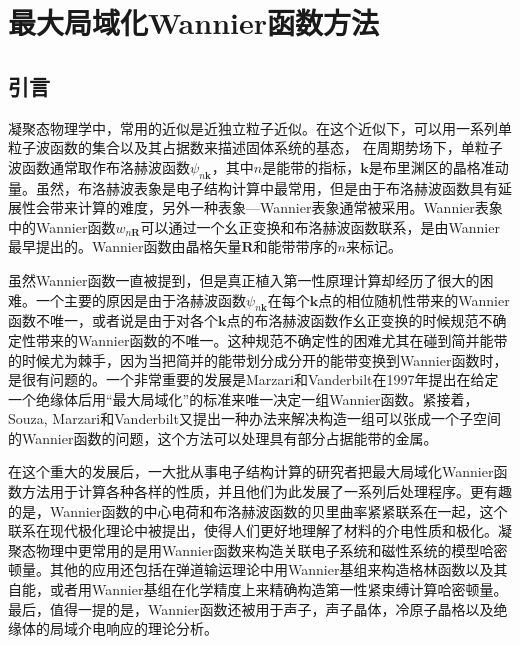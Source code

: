 \section{最大局域化Wannier函数方法}
\subsection{引言}
凝聚态物理学中，常用的近似是近独立粒子近似。在这个近似下，可以用一系列单粒子波函数的集合以及其占据数来描述固体系统的基态，
在周期势场下，单粒子波函数通常取作布洛赫波函数$\psi_{n\bm{k}}$，其中$n$是能带的指标，$\bm{k}$是布里渊区的晶格准动量。虽然，布洛赫波表象是电子结构计算中最常用，但是由于布洛赫波函数具有延展性会带来计算的难度，另外一种表象—Wannier表象通常被采用。Wannier表象中的Wannier函数$w_{n\bm{R}}$可以通过一个幺正变换和布洛赫波函数联系，是由Wannier最早提出的。Wannier函数由晶格矢量$\bm{R}$和能带带序的$n$来标记。

虽然Wannier函数一直被提到，但是真正植入第一性原理计算却经历了很大的困难。一个主要的原因是由于洛赫波函数$\psi_{n\bm{k}}$在每个$\bm{k}$点的相位随机性带来的Wannier函数不唯一，或者说是由于对各个$\bm{k}$点的布洛赫波函数作幺正变换的时候规范不确定性带来的Wannier函数的不唯一。这种规范不确定性的困难尤其在碰到简并能带的时候尤为棘手，因为当把简并的能带划分成分开的能带变换到Wannier函数时，是很有问题的。一个非常重要的发展是Marzari和Vanderbilt\cite{marzari_maximally_2012}在1997年提出在给定一个绝缘体后用“最大局域化”的标准来唯一决定一组Wannier函数。紧接着，Souza, Marzari和Vanderbilt\cite{souza_maximally-localized_2001}又提出一种办法来解决构造一组可以张成一个子空间的Wannier函数的问题，这个方法可以处理具有部分占据能带的金属。

在这个重大的发展后，一大批从事电子结构计算的研究者把最大局域化Wannier函数方法用于计算各种各样的性质，并且他们为此发展了一系列后处理程序。更有趣的是，Wannier函数的中心电荷和布洛赫波函数的贝里曲率紧紧联系在一起，这个联系在现代极化理论中被提出，使得人们更好地理解了材料的介电性质和极化\cite{king-smith_theory_1993}。凝聚态物理中更常用的是用Wannier函数来构造关联电子系统和磁性系统的模型哈密顿量。其他的应用还包括在弹道输运理论中用Wannier基组来构造格林函数以及其自能，或者用Wannier基组在化学精度上来精确构造第一性紧束缚计算哈密顿量。最后，值得一提的是，Wannier函数还被用于声子，声子晶体，冷原子晶格以及绝缘体的局域介电响应的理论分析。

